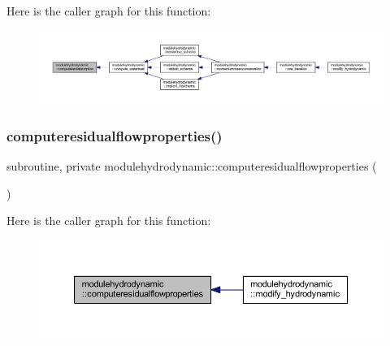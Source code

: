 Here is the caller graph for this function\+:\nopagebreak
\begin{figure}[H]
\begin{center}
\leavevmode
\includegraphics[width=350pt]{namespacemodulehydrodynamic_a2cc7d18aae53734d8068f7a35a0fd029_icgraph}
\end{center}
\end{figure}
\mbox{\label{namespacemodulehydrodynamic_a8f5cfb7e074cb11c3c46454e53806111}} 
\subsubsection{\texorpdfstring{computeresidualflowproperties()}{computeresidualflowproperties()}}
{\footnotesize\ttfamily subroutine, private modulehydrodynamic\+::computeresidualflowproperties (\begin{DoxyParamCaption}{ }\end{DoxyParamCaption})\hspace{0.3cm}{\ttfamily [private]}}

Here is the caller graph for this function\+:\nopagebreak
\begin{figure}[H]
\begin{center}
\leavevmode
\includegraphics[width=350pt]{namespacemodulehydrodynamic_a8f5cfb7e074cb11c3c46454e53806111_icgraph}
\end{center}
\end{figure}
\mbox{\label{namespacemodulehydrodynamic_a5267d6e9c0f3efab032ca1f82881b5dd}} 
